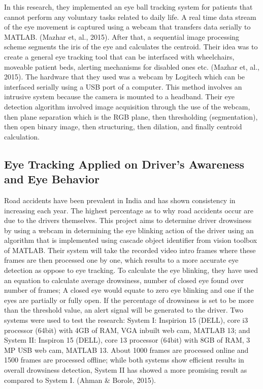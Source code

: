 In this research, they implemented an eye ball tracking system for patients that cannot perform any voluntary tasks related to daily life. A real time data stream of the eye movement is captured using a webcam that transfers data serially to MATLAB. (Mazhar et, al., 2015). After that, a sequential image processing scheme segments the iris of the eye and calculates the centroid. Their idea was to create a general eye tracking tool that can be interfaced with wheelchairs, moveable patient beds, alerting mechanisms for disabled ones etc. (Mazhar et, al., 2015). The hardware that they used was a webcam by Logitech which can be interfaced serially using a USB port of a computer. This method involves an intrusive system because the camera is mounted to a headband. Their eye detection algorithm involved image acquisition through the use of the webcam, then plane separation which is the RGB plane, then thresholding (segmentation), then open binary image, then structuring, then dilation, and finally centroid calculation.

\subsection{Eye Tracking Applied  on Driver’s Awareness and Eye Behavior}
Road accidents have been prevalent in India and has shown consistency in increasing each year. The highest percentage as to why road accidents occur are due to the drivers themselves. This project aims to determine driver drowsiness by using a webcam in determining the eye blinking action of the driver using an algorithm that is implemented using cascade object identifier from vision toolbox of MATLAB. Their system will take the recorded video intro frames where these frames are then processed one by one, which results to a more accurate eye detection as oppose to eye tracking. To calculate the eye blinking, they have used an equation to calculate average drowsiness, number of closed eye found over number of frames; A closed eye would equate to zero eye blinking and one if the eyes are partially or fully open. If the percentage of drowsiness is set to be more than the threshold value, an alert signal will be generated to the driver. Two systems were used to test the research: System I: Inspirion 15 (DELL), core i3 processor (64bit) with 4GB of RAM, VGA inbuilt web cam, MATLAB 13; and System II: Inspiron 15 (DELL), core 13 processor (64bit) with 8GB of RAM, 3 MP USB web cam, MATLAB 13. About 1000 frames are processed online and 1500 frames are processed offline; while both systems show efficient results in overall drowsiness detection, System II has showed a more promising result as compared to System I. (Ahman \& Borole, 2015).
\newline

